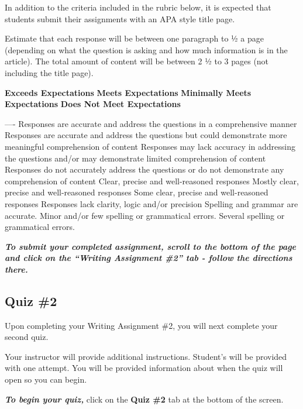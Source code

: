 \documentclass[
]{book}
\begin{document}
\begin{assessment}
In addition to the criteria included in the rubric below, it is expected that students submit their assignments with an APA style title page.

Estimate that each response will be between one paragraph to ½ a page (depending on what the question is asking and how much information is in the article). The total amount of content will be between 2 ½ to 3 pages (not including the title page).

\textbf{Exceeds Expectations} \textbar{} \textbf{Meets Expectations} \textbar{} \textbf{Minimally Meets Expectations} \textbar{} \textbf{Does Not Meet Expectations} \textbar{}

\textbar\textbar--\textbar--\textbar-\textbar{}
\textbar Responses are accurate and address the questions in a comprehensive manner \textbar Responses are accurate and address the questions but could demonstrate more meaningful comprehension of content \textbar Responses may lack accuracy in addressing the questions and/or may demonstrate limited comprehension of content \textbar{} Responses do not accurately address the questions or do not demonstrate any comprehension of content \textbar{}
\textbar Clear, precise and well-reasoned responses \textbar Mostly clear, precise and well-reasoned responses \textbar Some clear, precise and well-reasoned responses \textbar Responses lack clarity, logic and/or precision \textbar{}
\textbar{} \textbar Spelling and grammar are accurate. \textbar Minor and/or few spelling or grammatical errors. \textbar{} Several spelling or grammatical errors. \textbar{}

\textbf{\emph{To submit your completed assignment, scroll to the bottom of the page and click on the ``Writing Assignment \#2'' tab - follow the directions there.}}

\hypertarget{quiz-2}{%
\subsection*{\texorpdfstring{\textbf{Quiz \#2}}{Quiz \#2}}\label{quiz-2}}

Upon completing your Writing Assignment \#2, you will next complete your second quiz.

Your instructor will provide additional instructions. Student's will be provided with one attempt. You will be provided information about when the quiz will open so you can begin.

\textbf{\emph{To begin your quiz,}} click on the \textbf{Quiz \#2} tab at the bottom of the screen.
\end{assessment}
\end{document}

